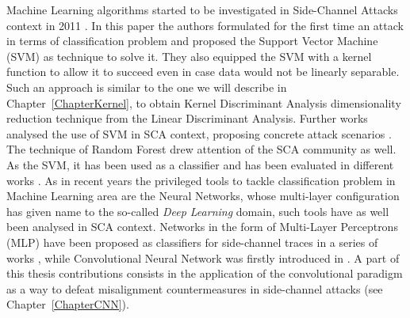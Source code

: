 Machine Learning algorithms started to be investigated in Side-Channel Attacks context in 2011 \cite{machineLearningSCA}. In this paper the authors formulated for the first time an attack in terms of classification problem and proposed the Support Vector Machine (SVM) \cite{cortes1995support,weston1998multi} as technique to solve it. They also equipped the SVM with a kernel function to allow it to succeed even in case data would not be linearly separable. Such an approach is similar to the one we will describe in Chapter~\ref{ChapterKernel}, to obtain Kernel Discriminant Analysis dimensionality reduction technique from the Linear Discriminant Analysis. Further works analysed the use of SVM in SCA context, proposing concrete attack scenarios \cite{intelligentMachineOmicide,effTA_SVM}. 
The technique of Random Forest \cite{lior2014data} drew attention of the SCA community as well. As the SVM, it has been used as a classifier and has been evaluated in different works \cite{lerman2015machine,lerman2015template,lerman2014power}. As in recent years the privileged tools to tackle classification problem in Machine Learning area are the Neural Networks, whose multi-layer configuration has given name to the so-called \emph{Deep Learning} domain, such tools have as well been analysed in SCA context. Networks in the form of Multi-Layer Perceptrons (MLP) have been proposed as classifiers for side-channel traces in a series of works \cite{martinasek2013optimization,martinasek2013innovative,martinasek2015profiling,martinasek2016profiling}, while Convolutional Neural Network was firstly introduced in \cite{maghrebi2016breaking}. A part of this thesis contributions consists in the application of the convolutional paradigm as a way to defeat misalignment countermeasures in side-channel attacks (see Chapter~\ref{ChapterCNN}).


